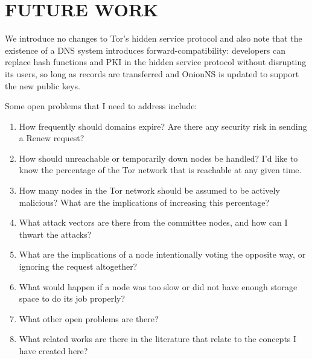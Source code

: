 
\chapter{FUTURE WORK}

We introduce no changes to Tor's hidden service protocol and also note that the existence of a DNS system introduces forward-compatibility: developers can replace hash functions and PKI in the hidden service protocol without disrupting its users, so long as records are transferred and OnionNS is updated to support the new public keys.

Some open problems that I need to address include:

\begin{enumerate}
	\item How frequently should domains expire? Are there any security risk in sending a Renew request?
	\item How should unreachable or temporarily down nodes be handled? I'd like to know the percentage of the Tor network that is reachable at any given time.
	\item How many nodes in the Tor network should be assumed to be actively malicious? What are the implications of increasing this percentage?
	\item What attack vectors are there from the committee nodes, and how can I thwart the attacks?
	\item What are the implications of a node intentionally voting the opposite way, or ignoring the request altogether?
	\item What would happen if a node was too slow or did not have enough storage space to do its job properly?
	\item What other open problems are there?
	\item What related works are there in the literature that relate to the concepts I have created here?
\end{enumerate}